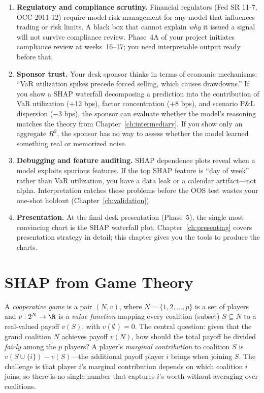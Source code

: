 \begin{enumerate}[nosep]
  \item \textbf{Regulatory and compliance scrutiny.}
  Financial regulators (Fed SR 11-7, OCC 2011-12) require model risk management for any model that influences trading or risk limits.
  A black box that cannot explain \emph{why} it issued a signal will not survive compliance review.
  Phase~4A of your project initiates compliance review at weeks~16--17; you need interpretable output ready before that.

  \item \textbf{Sponsor trust.}
  Your desk sponsor thinks in terms of economic mechanisms: ``VaR utilization spikes precede forced selling, which causes drawdowns.''
  If you show a SHAP waterfall decomposing a prediction into the contribution of VaR utilization (+12 bps), factor concentration (+8 bps), and scenario P\&L dispersion ($-$3 bps), the sponsor can evaluate whether the model's reasoning matches the theory from Chapter~\ref{ch:intermediary}.
  If you show only an aggregate $R^2$, the sponsor has no way to assess whether the model learned something real or memorized noise.

  \item \textbf{Debugging and feature auditing.}
  SHAP dependence plots reveal when a model exploits spurious features.
  If the top SHAP feature is ``day of week'' rather than VaR utilization, you have a data leak or a calendar artifact---not alpha.
  Interpretation catches these problems before the OOS test wastes your one-shot holdout (Chapter~\ref{ch:validation}).

  \item \textbf{Presentation.}
  At the final desk presentation (Phase~5), the single most convincing chart is the SHAP waterfall plot.
  Chapter~\ref{ch:presenting} covers presentation strategy in detail; this chapter gives you the tools to produce the charts.
\end{enumerate}

\section{SHAP from Game Theory}
\label{sec:shap-theory}

\begin{prereq}
A \emph{cooperative game} is a pair $(N, v)$, where $N = \{1, 2, \ldots, p\}$ is a set of players and $v : 2^N \to \R$ is a \emph{value function} mapping every coalition (subset) $S \subseteq N$ to a real-valued payoff $v(S)$, with $v(\emptyset) = 0$.
The central question: given that the grand coalition $N$ achieves payoff $v(N)$, how should the total payoff be divided \emph{fairly} among the $p$ players?
A player's \emph{marginal contribution} to coalition $S$ is $v(S \cup \{i\}) - v(S)$---the additional payoff player $i$ brings when joining $S$.
The challenge is that player $i$'s marginal contribution depends on which coalition $i$ joins, so there is no single number that captures $i$'s worth without averaging over coalitions.
\end{prereq}

